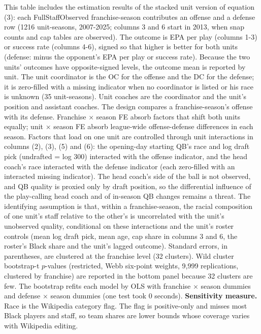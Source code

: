 \begin{table}[!h]
{\begin{threeparttable}
\begin{tablenotes}[para]
\item This table includes the estimation results of the stacked unit version of equation (3): each FullStaffObserved franchise-season contributes an offense and a defense row (1216 unit-seasons, 2007-2025; columns 3 and 6 start in 2013, when snap counts and cap tables are observed). The outcome is EPA per play (columns 1-3) or success rate (columns 4-6), signed so that higher is better for both units (defense: minus the opponent's EPA per play or success rate). Because the two units' outcomes have opposite-signed levels, the outcome mean is reported by unit. The unit coordinator is the OC for the offense and the DC for the defense; it is zero-filled with a missing indicator when no coordinator is listed or his race is unknown (35 unit-seasons). Unit coaches are the coordinator and the unit's position and assistant coaches. The design compares a franchise-season's offense with its defense. Franchise $\times$ season FE absorb factors that shift both units equally; unit $\times$ season FE absorb league-wide offense-defense differences in each season. Factors that load on one unit are controlled through unit interactions in columns (2), (3), (5) and (6): the opening-day starting QB's race and log draft pick (undrafted = log 300) interacted with the offense indicator, and the head coach's race interacted with the defense indicator (each zero-filled with an interacted missing indicator). The head coach's side of the ball is not observed, and QB quality is proxied only by draft position, so the differential influence of the play-calling head coach and of in-season QB changes remains a threat. The identifying assumption is that, within a franchise-season, the racial composition of one unit's staff relative to the other's is uncorrelated with the unit's unobserved quality, conditional on these interactions and the unit's roster controls (mean log draft pick, mean age, cap share in columns 3 and 6, the roster's Black share and the unit's lagged outcome). Standard errors, in parentheses, are clustered at the franchise level (32 clusters). Wild cluster bootstrap-t $p$-values (restricted, Webb six-point weights, 9,999 replications, clustered by franchise) are reported in the bottom panel because 32 clusters are few. The bootstrap refits each model by OLS with franchise $\times$ season dummies and defense $\times$ season dummies (one test took 0 seconds). \textbf{Sensitivity measure.} Race is the Wikipedia category flag. The flag is positive-only and misses most Black players and staff, so team shares are lower bounds whose coverage varies with Wikipedia editing.
\end{tablenotes}
\end{threeparttable}}
\end{table}
